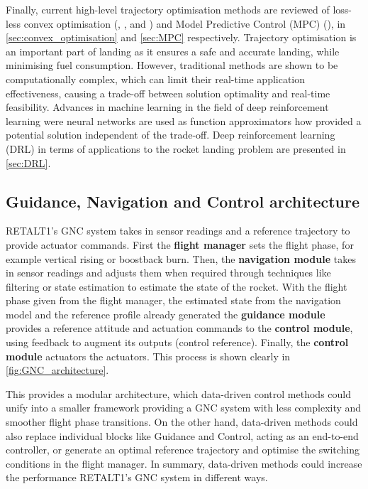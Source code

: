 Finally, current high-level trajectory optimisation methods are reviewed of loss-less convex optimisation (\cite{Acikmese2007}, \cite{Acikmese2013}, \cite{Blackmore2010} and \cite{Wang2020}) and Model Predictive Control (MPC) (\cite{Wang2018}), in \autoref{sec:convex_optimisation} and \autoref{sec:MPC} respectively. Trajectory optimisation is an important part of landing as it ensures a safe and accurate landing, while minimising fuel consumption. However, traditional methods are shown to be computationally complex, which can limit their real-time application effectiveness, causing a trade-off between solution optimality and real-time feasibility. Advances in machine learning in the field of deep reinforcement learning were neural networks are used as function approximators how provided a potential solution independent of the trade-off. Deep reinforcement learning (DRL) in terms of applications to the rocket landing problem are presented in \autoref{sec:DRL}.

\subsection{Guidance, Navigation and Control architecture}
\label{sec:GNC}

RETALT1's GNC system takes in sensor readings and a reference trajectory to provide actuator commands. First the \textbf{flight manager} sets the flight phase, for example vertical rising or boostback burn. Then, the \textbf{navigation module} takes in sensor readings and adjusts them when required through techniques like filtering or state estimation to estimate the state of the rocket. With the flight phase given from the flight manager, the estimated state from the navigation model and the reference profile already generated the \textbf{guidance module} provides a reference attitude and actuation commands to the \textbf{control module}, using feedback to augment its outputs (control reference). Finally, the \textbf{control module} actuators the actuators. This process is shown clearly in \autoref{fig:GNC_architecture}.

This provides a modular architecture, which data-driven control methods could unify into a smaller framework providing a GNC system with less complexity and smoother flight phase transitions. On the other hand, data-driven methods could also replace individual blocks like Guidance and Control, acting as an end-to-end controller, or generate an optimal reference trajectory and optimise the switching conditions in the flight manager. In summary, data-driven methods could increase the performance RETALT1's GNC system in different ways.

